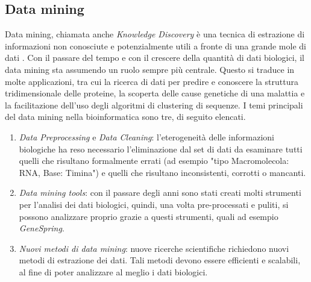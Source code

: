 \subsection{Data mining}
Data mining, chiamata anche \textit{Knowledge Discovery} è una tecnica di estrazione di informazioni non conosciute e potenzialmente utili a fronte di una grande mole di dati \cite{dataMiningInBioinformatics}. Con il passare del tempo e con il crescere della quantità di dati biologici, il data mining sta assumendo un ruolo sempre più centrale. Questo si traduce in molte applicazioni, tra cui la ricerca di dati per predire e conoscere la struttura tridimensionale delle proteine, la scoperta delle cause genetiche di una malattia e la facilitazione dell'uso degli algoritmi di clustering di sequenze.
\newline
I temi principali del data mining nella bioinformatica sono tre, di seguito elencati.
\begin{enumerate}
	\item \textit{Data Preprocessing} e \textit{Data Cleaning}: l'eterogeneità delle informazioni biologiche ha reso necessario l'eliminazione dal set di dati da esaminare tutti quelli che risultano formalmente errati (ad esempio "tipo Macromolecola: RNA, Base: Timina") e quelli che risultano inconsistenti, corrotti o mancanti.
	\item \textit{Data mining tools}: con il passare degli anni sono stati creati molti strumenti per l'analisi dei dati biologici, quindi, una volta pre-processati e puliti, si possono analizzare proprio grazie a questi strumenti, quali ad esempio \textit{GeneSpring}.
	\item \textit{Nuovi metodi di data mining}: nuove ricerche scientifiche richiedono nuovi metodi di estrazione dei dati. Tali metodi devono essere efficienti e scalabili, al fine di poter analizzare al meglio i dati biologici.
\end{enumerate}

